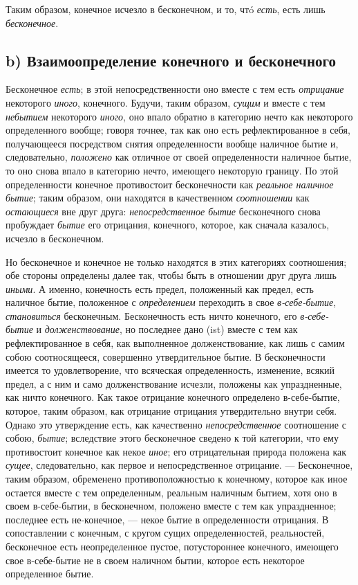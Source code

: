 Таким образом, конечное исчезло в бесконечном, и то, чтó
{\em есть}, есть лишь
{\em бесконечное}.

\subsection[b) Взаимоопределение конечного и бесконечного]{b) Взаимоопределение конечного и бесконечного}
Бесконечное {\em есть}; в этой непосредственности оно
вместе с тем есть {\em отрицание} некоторого
{\em иного}, конечного. Будучи, таким образом,
{\em сущим} и вместе с тем
{\em небытием} некоторого
{\em иного}, оно впало обратно в категорию нечто как
некоторого определенного вообще; говоря точнее, так как оно есть
рефлектированное в себя, получающееся посредством снятия определенности
вообще наличное бытие и, следовательно, {\em положено}
как отличное от своей определенности наличное бытие, то оно снова впало в
категорию нечто, имеющего некоторую границу. По этой определенности
конечное противостоит бесконечности как {\em реальное
наличное бытие}; таким образом, они находятся в качественном
{\em соотношении} как
{\em остающиеся} вне друг друга:
{\em непосредственное бытие} бесконечного снова
пробуждает {\em бытие} его отрицания, конечного,
которое, как сначала казалось, исчезло в бесконечном.

Но бесконечное и конечное не только находятся в этих категориях соотношения;
обе стороны определены далее так, чтобы быть в отношении друг друга лишь
{\em иными}. А именно, конечность есть предел,
положенный как предел, есть наличное бытие, положенное с
{\em определением} переходить в свое
{\em в-себе-бытие},
{\em становиться} бесконечным. Бесконечность есть ничто
конечного, его {\em в-себе-бытие} и
{\em долженствование}, но последнее дано (ist) вместе с
тем как рефлектированное в себя, как выполненное долженствование, как лишь
с самим собою соотносящееся, совершенно утвердительное бытие. В
бесконечности имеется то удовлетворение, что всяческая определенность,
изменение, всякий предел, а с ним и само долженствование исчезли, положены
как упраздненные, как ничто конечного. Как такое отрицание конечного
определено в-себе-бытие, которое, таким образом, как отрицание отрицания
утвердительно внутри себя. Однако это утверждение есть, как качественно
{\em непосредственное} соотношение с собою,
{\em бытие}; вследствие этого бесконечное сведено к той
категории, что ему противостоит конечное как некое
{\em иное}; его отрицательная природа положена как
{\em сущее}, следовательно, как первое и
непосредственное отрицание. — Бесконечное, таким образом, обременено
противоположностью к конечному, которое как иное остается вместе с тем
определенным, реальным наличным бытием, хотя оно в своем в-себе-бытии, в
бесконечном, положено вместе с тем как упраздненное; последнее есть
не-конечное, — некое бытие в определенности отрицания. В сопоставлении с
конечным, с кругом сущих определенностей, реальностей, бесконечное есть
неопределенное пустое, потустороннее конечного, имеющего свое в-себе-бытие
не в своем наличном бытии, которое есть некоторое определенное бытие.

